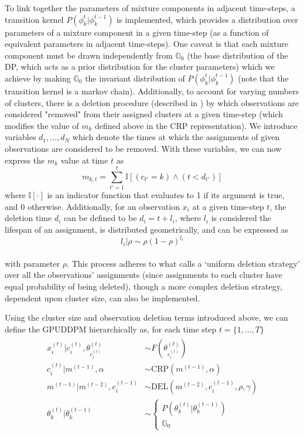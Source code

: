 \documentclass{article}
\begin{document}
To link together the parameters of mixture components in adjacent time-steps, a transition kernel $P(\phi_{k}^{t} | \phi_{k}^{t-1})$ is implemented, which provides a distribution over parameters of a mixture component in a given time-step (as a function of equivalent parameters in adjacent time-steps). One caveat is that each mixture component must be drawn independently from $\mathbb{G}_{0}$ (the base distribution of the DP, which acts as a prior distribution for the cluster parameters) which we achieve by making $\mathbb{G}_{0}$ the invariant distribution of $P(\phi_{k}^{t} | \phi_{k}^{t-1})$ (note that the transition kernel is a markov chain). Additionally, to account for varying numbers of clusters, there is a deletion procedure (described in \cite{caron_2007}) by which observations are considered "removed" from their assigned clusters at a given time-step (which modifies the value of $m_{k}$ defined above in the CRP representation). We introduce variables $d_{1}, \ldots, d_{N}$ which denote the times at which the assignments of given observations are considered to be removed. With these variables, we can now express the $m_{k}$ value at time $t$ as
\begin{equation}
m_{k,t} = \sum_{t' = 1}^{t} \mathbb{I}[(c_{t'}=k) \wedge (t < d_{t'})]
\end{equation}
where $\mathbb{I}[\cdot]$ is an indicator function that evaluates to 1 if its argument is true, and 0 otherwise. Additionally, for an observation $x_{i}$ at a given time-step $t$, the deletion time $d_{i}$ can be defined to be $d_{i} = t + l_{i}$, where $l_{i}$ is considered the lifespan of an assignment, is distributed geometrically, and can be expressed as
\begin{equation}
l_{i} | \rho  \sim  \rho(1 - \rho)^{l_{i}}
\end{equation} \\
with parameter $\rho$. This process adheres to what \cite{caron_2007} calls a `uniform deletion strategy' over all the observations' assignments (since assignments to each cluster have equal probability of being deleted), though a more complex deletion strategy, dependent upon cluster size, can also be implemented.

Using the cluster size and observation deletion terms introduced above, we can define the GPUDDPM hierarchically as, for each time step $t = \{1, \ldots, T\}$
\begin{align}
\begin{split}
	x_{i}^{(t)} | c_{i}^{(t)}, \theta_{c_{i}^{(t)}}^{(t)} &\sim F(\theta_{c_{i}^{(t)}}^{(t)}) \\
	c_{i}^{(t)} | m^{(t-1)}, \alpha  &\sim  \text{CRP}(m^{(t-1)}, \alpha) \\
	m^{(t-1)} | m^{(t-2)}, c_{i}^{(t-1)}  &\sim \text{DEL}(m^{(t-2)}, c_{i}^{(t-1)}, \rho, \gamma) \\
	\theta_{k}^{(t)} | \theta_{k}^{(t-1)}   &\sim 
\begin{cases}
	P(\theta_{k}^{(t)} | \theta_{k}^{(t-1)}) \\
	\mathbb{G}_{0}
\end {cases}
\end{split}
\end{align}
\end{document}
